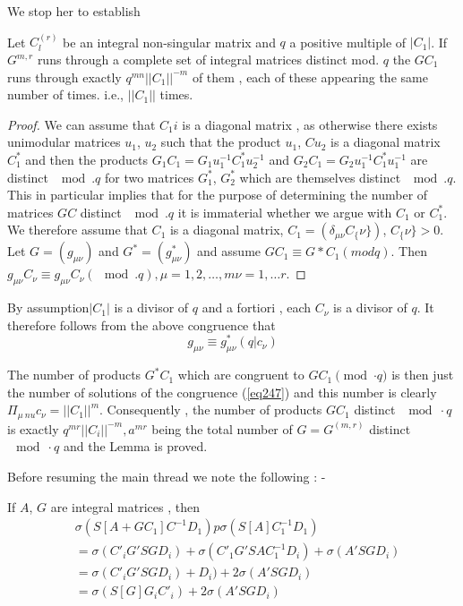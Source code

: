 We stop her to establish 

\begin{lem}\label{chap13:lem24} %
 Let $ C^{(r)}_l$ be an integral non-singular matrix and $q$ a
  positive multiple of $|C_1|$. If $G^{m , r}$ runs through a complete
  set of integral matrices distinct mod. $q$ the $GC_1$ runs through
  exactly $q ^{ m n } || C_1 || ^{-m}$ of them , each of these
  appearing the same number of times. i.e., $|| C_1 ||$ times.  
\end{lem}

\begin{proof}
We can assume that $C_1i$ is a diagonal matrix , as otherwise there
exists unimodular matrices $u_1$, $u_2$ such that the product $u_1$, $C
u_2$ is a diagonal matrix $C_1^*$ and then the products $G_1 C_1 = G_1
u_1 ^{-1} C^*_1 u^{-1}_2$ and $G_2 C_1 = G_2 u_1 ^{-1} C^*_1 u^{-1}_1$
are distinct $\mod. q$ for two matrices $G^*_1$, $G^*_2$ which are
themselves distinct $\mod . q$. This in particular implies that for
the purpose of determining the number of matrices $GC$ distinct $\mod
. q$ it is immaterial whether we argue with $C_1$ or $C^{*}_1$. We
therefore assume that $C_1$ is a diagonal matrix, $C_1 = (\delta _{\mu
  \nu} C_\{\nu\})$, $C_\{\nu\} > 0$. Let $G = ( g _{\mu \nu})$ and $G^*
= (g^*_{ \mu \nu})$ and assume $GC_1\equiv G*C_1 (mod q)$. Then $
g_{\mu \nu } C_\nu \equiv g_{\mu \nu }C_\nu (\mod . q), \mu = 1 , 2 ,
\ldots , m \nu = 1, \ldots r$.  
\end{proof}

By assumption\pageoriginale $|C_1|$ is a divisor of $q$ and a fortiori ,
each $C_\nu$ is a divisor of $q$. It therefore follows from the above
congruence that  
\begin{equation*}
g _{\mu\nu} \equiv g^\ast_{\mu\nu}(q | c_\nu ) \tag{247}\label{eq247} 
\end{equation*}

The number of products $G^* C_1$ which are congruent to $G
C_1\pmod{\cdot q}$ is then just the number of solutions of the
congruence (\ref{eq247}) 
and this number is clearly $ \Pi_{ \mu \ nu } c_\nu = || C_1||^m
$. Consequently , the number of products $GC_1$ distinct $\mod \cdot q$ is
exactly $ q ^{m r } || C_i || ^{-m}, a^{mr}$ being the total number of
$ G = G ^{( m , r)}$ distinct $\mod\cdot q$ and the Lemma is proved.  

Before resuming the main thread we note the following : - 

If $A$, $G$ are integral matrices , then 
\begin{align*}
&  \sigma (S [ A + GC_1] C^{ -1} D_1) p \sigma ( S[A] C^{-1}_1 D_1)\\
& = \sigma (C'_i G' S G D_i) + \sigma (C'_1 G' S A C_1^{-1} D_i) +
  \sigma (A' S G D_i)\\ 
& = \sigma (C'_i G' S G D_i) + D_i) + 2 \sigma (A' S G D_i)\\
& = \sigma (S[G] G_i C'_i) + 2 \sigma (A' S G D_i) \tag{248}\label{eq248} 
\end{align*}

